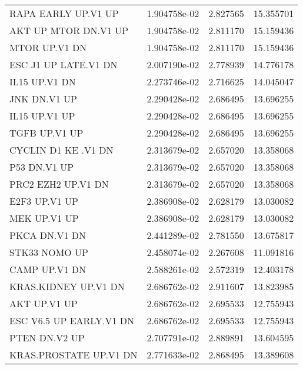 \begin{tabular}{lrrr}
               RAPA EARLY UP.V1 UP &      1.904758e-02 &  2.827565 &       15.355701 \\
              AKT UP MTOR DN.V1 UP &      1.904758e-02 &  2.811170 &       15.159436 \\
                     MTOR UP.V1 DN &      1.904758e-02 &  2.811170 &       15.159436 \\
              ESC J1 UP LATE.V1 DN &      2.007190e-02 &  2.778939 &       14.776178 \\
                     IL15 UP.V1 DN &      2.273746e-02 &  2.716625 &       14.045047 \\
                      JNK DN.V1 UP &      2.290428e-02 &  2.686495 &       13.696255 \\
                     IL15 UP.V1 UP &      2.290428e-02 &  2.686495 &       13.696255 \\
                     TGFB UP.V1 UP &      2.290428e-02 &  2.686495 &       13.696255 \\
               CYCLIN D1 KE .V1 DN &      2.313679e-02 &  2.657020 &       13.358068 \\
                      P53 DN.V1 UP &      2.313679e-02 &  2.657020 &       13.358068 \\
                PRC2 EZH2 UP.V1 DN &      2.313679e-02 &  2.657020 &       13.358068 \\
                     E2F3 UP.V1 UP &      2.386908e-02 &  2.628179 &       13.030082 \\
                      MEK UP.V1 UP &      2.386908e-02 &  2.628179 &       13.030082 \\
                     PKCA DN.V1 DN &      2.441289e-02 &  2.781550 &       13.675817 \\
                     STK33 NOMO UP &      2.458074e-02 &  2.267608 &       11.091816 \\
                     CAMP UP.V1 DN &      2.588261e-02 &  2.572319 &       12.403178 \\
              KRAS.KIDNEY UP.V1 DN &      2.686762e-02 &  2.911607 &       13.823985 \\
                      AKT UP.V1 UP &      2.686762e-02 &  2.695533 &       12.755943 \\
           ESC V6.5 UP EARLY.V1 DN &      2.686762e-02 &  2.695533 &       12.755943 \\
                     PTEN DN.V2 UP &      2.707791e-02 &  2.889891 &       13.604595 \\
            KRAS.PROSTATE UP.V1 DN &      2.771633e-02 &  2.868495 &       13.389608 \\

\end{tabular}
